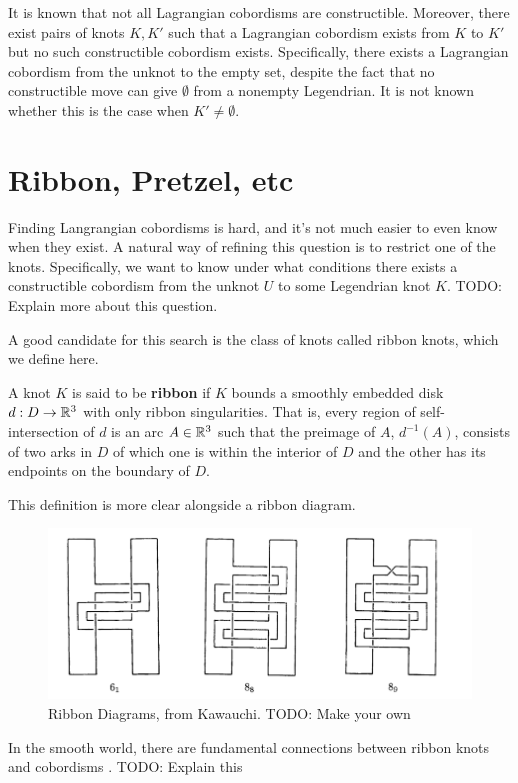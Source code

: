It is known that not all Lagrangian cobordisms are constructible. Moreover, there exist pairs of knots $K, K'$ such that a Lagrangian cobordism exists from $K$ to $K'$ but no such constructible cobordism exists. Specifically, there exists a Lagrangian cobordism from the unknot to the empty set, despite the fact that no constructible move can give $\emptyset$ from a nonempty Legendrian. It is not known whether this is the case when $K' \neq \emptyset$.

\section{Ribbon, Pretzel, etc}

Finding Langrangian cobordisms is hard, and it's not much easier to even know when they exist.
A natural way of refining this question is to restrict one of the knots.
Specifically, we want to know under what conditions there exists a constructible cobordism from the unknot $U$ to some Legendrian knot $K$. TODO: Explain more about this question.

A good candidate for this search is the class of knots called ribbon knots, which we define here.

\begin{definition}
    A knot $K$ is said to be \textbf{ribbon} if $K$ bounds a smoothly embedded disk $d: D \to \mathbb{R}^3$ with only ribbon singularities.
    That is, every region of self-intersection of $d$ is an arc $A \in \mathbb{R}^3$ such that the preimage of $A$, $d^{-1} (A)$, consists of two arks in $D$ of which one is within the interior of $D$ and the other has its endpoints on the boundary of $D$.
\end{definition}

This definition is more clear alongside a ribbon diagram.

\begin{figure}[ht!]
    \centering
    \includegraphics[width=0.8\linewidth]{images/ribbon-knots-kawauchi.png}
    \caption{Ribbon Diagrams, from Kawauchi. TODO: Make your own}%
    \label{fig:ribbon-knots-kawauchi}
\end{figure}

In the smooth world, there are fundamental connections between ribbon knots and cobordisms \cite{fox-milnor}. TODO: Explain this

